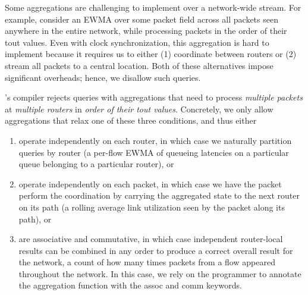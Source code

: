 
Some aggregations are challenging to implement over a network-wide stream. For
example, consider an EWMA over some packet field across all packets seen
anywhere in the entire network, while processing packets in the order of their
{\ct tout} values. Even with clock synchronization, this aggregation is hard to
implement because it requires us to either (1) coordinate between routers or
(2) stream all packets to a central location. Both of these alternatives impose
significant overheads; hence, we disallow such queries.

\TheSystem's compiler rejects queries with aggregations that need to process
{\em multiple packets} at {\em multiple routers} in {\em order of their {\ct
tout} values}. Concretely, we only allow aggregations that relax one of these
three conditions, and thus either
\begin{enumerate}
\item operate independently on each router, in which case we naturally
  partition queries by router (\eg a per-flow EWMA of queueing latencies on a
  particular queue belonging to a particular router), or
\item operate independently on each packet, in which case we have the packet
  perform the coordination by carrying the aggregated state to the next router on
  its path (\eg a rolling average link utilization seen by the packet
  along its path), or
\item are associative and commutative, in which case independent router-local results can be
  combined in any order to produce a correct overall result for the network,
  \eg a count of how many times packets from a flow
  appeared throughout the network. In this case, we rely on the
  programmer to annotate the aggregation function with the
  {\ct assoc} and {\ct comm} keywords.
\end{enumerate}
